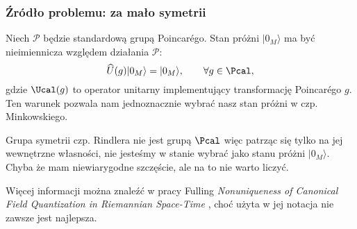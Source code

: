 \documentclass[10pt,t]{beamer}
\begin{document}
\begin{frame}
  \frametitle{Źródło problemu: za mało symetrii}


  Niech $\mathcal{P}$ będzie standardową grupą Poincar\'{e}go. Stan
  próżni $| 0_{ M } \rangle$ ma być nieimiennicza względem działania
  $\mathcal{P}$:
  \begin{equation}
    \label{eq:Promieniowanie-Hawkinga-11}
    \widehat{U}( g ) | 0_{ M } \rangle = | 0_{ M } \rangle, \qquad
    \forall g \in \Pcal,
  \end{equation}
  gdzie $\Ucal( g )$ to operator unitarny implementujący
  transformację Poincar\'{e}go $g$. Ten warunek pozwala nam
  jednoznacznie wybrać nasz stan próżni w czp. Minkowskiego.


  Grupa symetrii czp. Rindlera nie jest grupą $\Pcal$ więc
  patrząc się tylko na jej wewnętrzne własności, nie jesteśmy w stanie
  wybrać jako stanu próżni $| 0_{ M } \rangle$. Chyba że mam
  niewiarygodne szczęście, ale na to nie warto liczyć.

  Więcej informacji można znaleźć w pracy Fulling \textit{Nonuniqueness
    of Canonical Field Quantization in Riemannian Space-Time}
  \cite{FullingNonuniquenessOfCanocialFieldQuantizationInRiemannian1973},
  choć użyta w jej notacja nie zawsze jest najlepsza.

\end{frame}
\end{document}
